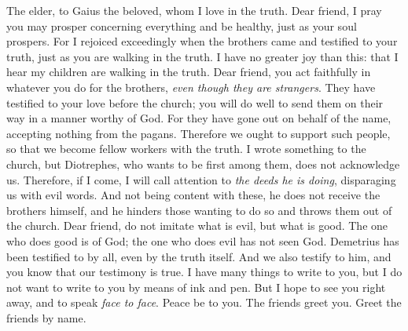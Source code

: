 
\begin{biblechapter} %
 The elder, to Gaius the beloved, whom I love in the truth.
\verse Dear friend, I pray you may prosper concerning everything and be healthy, just as your soul prospers.
\verse For I rejoiced exceedingly when the brothers came and testified to your truth, just as you are walking in the truth.
\verse I have no greater joy than this: that I hear my children are walking in the truth.
 Dear friend, you act faithfully in whatever you do for the brothers, \textit{even though they are strangers}.
\verse They have testified to your love before the church; you will do well to send them on their way in a manner worthy of God.
\verse For they have gone out on behalf of the name, accepting nothing from the pagans.
\verse Therefore we ought to support such people, so that we become fellow workers with the truth.
 I wrote something to the church, but Diotrephes, who wants to be first among them, does not acknowledge us.
\verse Therefore, if I come, I will call attention to \textit{the deeds he is doing}, disparaging us with evil words. And not being content with these, he does not receive the brothers himself, and he hinders those wanting to do so and throws them out of the church.
\verse Dear friend, do not imitate what is evil, but what is good. The one who does good is of God; the one who does evil has not seen God.
 Demetrius has been testified to by all, even by the truth itself. And we also testify to him, and you know that our testimony is true.
 I have many things to write to you, but I do not want to write to you by means of ink and pen.
\verse But I hope to see you right away, and to speak \textit{face to face}.
\verse Peace be to you. The friends greet you. Greet the friends by name.
\end{biblechapter}


